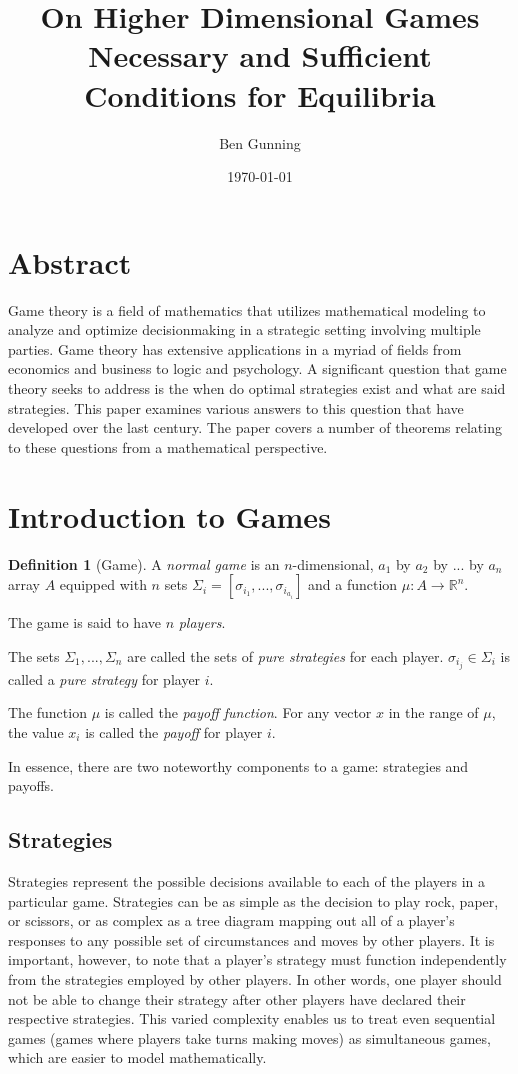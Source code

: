 \documentclass[12pt]{article}
\title{\textbf{\Large{On Higher Dimensional Games}} \\ \large{\textbf{Necessary and Sufficient Conditions for Equilibria}}}
\author{Ben Gunning}
\date{\today}
\theoremstyle{definition}
\newtheorem{definition}[theorem]{Definition}
\theoremstyle{remark}
\begin{document}
\maketitle



\section*{Abstract}
Game theory is a field of mathematics that utilizes mathematical modeling to analyze and optimize decisionmaking in a strategic setting involving multiple parties. Game theory has extensive applications in a myriad of fields from economics and business to logic and psychology. A significant question that game theory
seeks to address is the when do optimal strategies exist and what are said strategies. This paper examines various answers to this question that have developed over the last century. The paper covers a number of theorems relating to these questions from a mathematical perspective.

\section{Introduction to Games}

\begin{definition}[Game]
A \emph{normal game} is an $n$-dimensional, $a_1$ by $a_2$ by $...$ by $a_n$ array $A$ equipped with $n$ sets $\Sigma_i = [\sigma_{i_1} , ... , \sigma_{i_{a_i}}]$ and a function $\mu:A \rightarrow \mathbb{R}^n$.

The game is said to have $n$ \emph{players}.

The sets $\Sigma_1 , ... , \Sigma_n$ are called the sets of \emph{pure strategies} for each player. $\sigma_{i_j} \in \Sigma_i$ is called a \emph{pure strategy} for player $i$.

The function $\mu$ is called the \emph{payoff function}. For any vector $x$ in the range of $\mu$, the value $x_i$ is called the \emph{payoff} for player $i$.
\end{definition}

In essence, there are two noteworthy components to a game: strategies and payoffs.



\subsection{Strategies}

Strategies represent the possible decisions available to each of the players in a particular game. Strategies can be as simple as the decision to play rock, paper, or scissors, or as complex as a tree diagram mapping out all of a player's responses to any possible set of circumstances and moves by other players.
It is important, however, to note that a player's strategy must function independently from the strategies employed by other players. In other words, one player should not be able to change their strategy after other players have declared their respective strategies. This varied complexity enables us to treat even
sequential games (games where players take turns making moves) as simultaneous games, which are easier to model mathematically.
\end{document}
